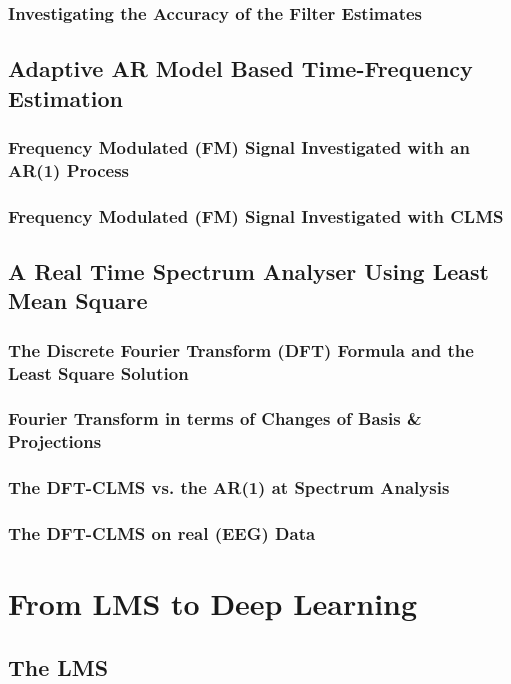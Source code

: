 \documentclass[12pt]{article}
\begin{document}
		\subsubsection{Investigating the Accuracy of the Filter Estimates}
	\subsection{Adaptive AR Model Based Time-Frequency Estimation} \label{sec: 3-2-adaptive-ar-spectrum-estimate}
		\subsubsection{Frequency Modulated (FM) Signal Investigated with an AR(1) Process}
		\subsubsection{Frequency Modulated (FM) Signal Investigated with CLMS}
	\subsection{A Real Time Spectrum Analyser Using Least Mean Square} \label{sec: 3-3-real-time-spectrum-LMS}
		\subsubsection{The Discrete Fourier Transform (DFT) Formula and the Least Square Solution}
		\subsubsection{Fourier Transform in terms of Changes of Basis \& Projections}
		\subsubsection{The DFT-CLMS vs. the AR(1) at Spectrum Analysis}
		\subsubsection{The DFT-CLMS on real (EEG) Data}
	
	
\pagebreak
\section{From LMS to Deep Learning} \label{sec: 4-LMS-to-DL}
	\subsection{The LMS} \label{sec: 4-1-LMS}
\end{document}
